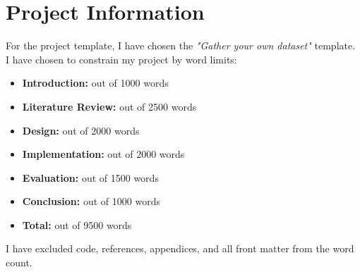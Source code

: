 
{}

\vspace*{3cm}

\begingroup
\chapter*{Project Information}

For the project template, I have chosen the \emph{"Gather your own dataset"} template. 
I have chosen to constrain my project by word limits:

\begin{itemize}
    \item \textbf{Introduction:} out of 1000 words
    \item \textbf{Literature Review:} out of 2500 words
    \item \textbf{Design:} out of 2000 words
    \item \textbf{Implementation:} out of 2000 words
    \item \textbf{Evaluation:} out of 1500 words
    \item \textbf{Conclusion:} out of 1000 words
    \item \textbf{Total:} out of 9500 words
\end{itemize}

I have excluded code, references, appendices, and all front matter from the word count.


\endgroup

